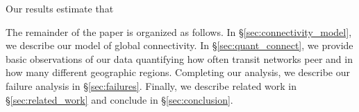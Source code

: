 Our results estimate that \justine{\ldots}

The remainder of the paper is organized as follows. In \S\ref{sec:connectivity_model}, we describe our model of global connectivity.
In \S\ref{sec:quant_connect}, we provide basic observations of our data quantifying how often transit networks peer and in how many different geographic regions.
Completing our analysis, we describe our failure analysis in \S\ref{sec:failures}.
Finally, we describe related work in  \S\ref{sec:related_work} and conclude in \S\ref{sec:conclusion}.
